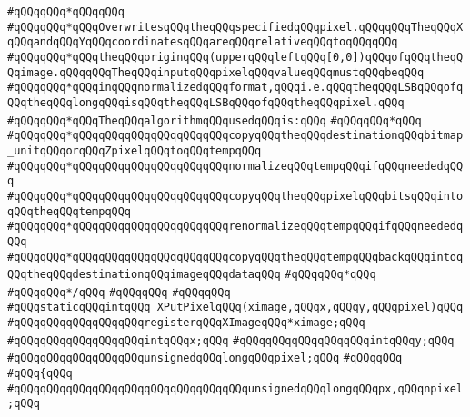 \verb|#qQQqqQQq*qQQqqQQq|\newline
\verb|#qQQqqQQq*qQQqOverwritesqQQqtheqQQqspecifiedqQQqpixel.qQQqqQQqTheqQQqXqQQqandqQQqYqQQqcoordinatesqQQqareqQQqrelativeqQQqtoqQQqqQQq|\newline
\verb|#qQQqqQQq*qQQqtheqQQqoriginqQQq(upperqQQqleftqQQq[0,0])qQQqofqQQqtheqQQqimage.qQQqqQQqTheqQQqinputqQQqpixelqQQqvalueqQQqmustqQQqbeqQQq|\newline
\verb|#qQQqqQQq*qQQqinqQQqnormalizedqQQqformat,qQQqi.e.qQQqtheqQQqLSBqQQqofqQQqtheqQQqlongqQQqisqQQqtheqQQqLSBqQQqofqQQqtheqQQqpixel.qQQq|\newline
\verb|#qQQqqQQq*qQQqTheqQQqalgorithmqQQqusedqQQqis:qQQq|\newline
\verb|#qQQqqQQq*qQQq|\newline
\verb|#qQQqqQQq*qQQqqQQqqQQqqQQqqQQqqQQqcopyqQQqtheqQQqdestinationqQQqbitmap_unitqQQqorqQQqZpixelqQQqtoqQQqtempqQQq|\newline
\verb|#qQQqqQQq*qQQqqQQqqQQqqQQqqQQqqQQqnormalizeqQQqtempqQQqifqQQqneededqQQq|\newline
\verb|#qQQqqQQq*qQQqqQQqqQQqqQQqqQQqqQQqcopyqQQqtheqQQqpixelqQQqbitsqQQqintoqQQqtheqQQqtempqQQq|\newline
\verb|#qQQqqQQq*qQQqqQQqqQQqqQQqqQQqqQQqrenormalizeqQQqtempqQQqifqQQqneededqQQq|\newline
\verb|#qQQqqQQq*qQQqqQQqqQQqqQQqqQQqqQQqcopyqQQqtheqQQqtempqQQqbackqQQqintoqQQqtheqQQqdestinationqQQqimageqQQqdataqQQq|\newline
\verb|#qQQqqQQq*qQQq|\newline
\verb|#qQQqqQQq*/qQQq|\newline
\verb|#qQQqqQQq|\newline
\verb|#qQQqqQQq|\newline
\verb|#qQQqstaticqQQqintqQQq_XPutPixelqQQq(ximage,qQQqx,qQQqy,qQQqpixel)qQQq|\newline
\verb|#qQQqqQQqqQQqqQQqqQQqregisterqQQqXImageqQQq*ximage;qQQq|\newline
\verb|#qQQqqQQqqQQqqQQqqQQqintqQQqx;qQQq|\newline
\verb|#qQQqqQQqqQQqqQQqqQQqintqQQqy;qQQq|\newline
\verb|#qQQqqQQqqQQqqQQqqQQqunsignedqQQqlongqQQqpixel;qQQq|\newline
\verb|#qQQqqQQq|\newline
\verb|#qQQq{qQQq|\newline
\verb|#qQQqqQQqqQQqqQQqqQQqqQQqqQQqqQQqqQQqunsignedqQQqlongqQQqpx,qQQqnpixel;qQQq|\newline
